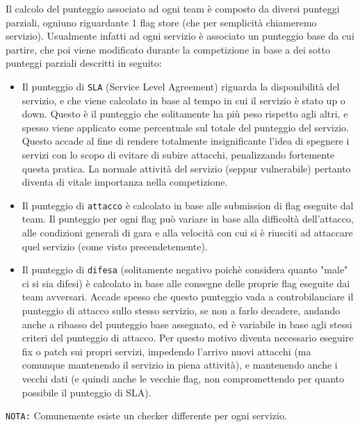Il calcolo del punteggio associato ad ogni team è composto da diversi punteggi parziali, ogniuno riguardante 1 flag store (che per semplicità chiameremo servizio).
Usualmente infatti ad ogni servizio è associato un punteggio base da cui partire, che poi viene modificato durante la competizione in base a dei sotto punteggi parziali descritti in seguito:
\begin{itemize}
    \setlength{\itemsep}{5pt}
    \setlength{\parskip}{5pt}
    \item Il punteggio di \texttt{SLA} (Service Level Agreement) riguarda la disponibilità del servizio, e che viene calcolato in base al tempo in cui il servizio è stato up o down.
    Questo è il punteggio che solitamente ha più peso rispetto agli altri, e spesso viene applicato come percentuale sul totale del punteggio del servizio. Questo accade al fine di
    rendere totalmente insignificante l'idea di spegnere i servizi con lo scopo di evitare di subire attacchi, penalizzando fortemente questa pratica.
    La normale attività del servizio (seppur vulnerabile) pertanto diventa di vitale importanza nella competizione.
    \item Il punteggio di \texttt{attacco} è calcolato in base alle submission di flag eseguite dal team. Il punteggio per ogni flag può variare in base alla difficoltà dell'attacco,
    alle condizioni generali di gara e alla velocità con cui si è riusciti ad attaccare quel servizio (come visto precendetemente).
    \item Il punteggio di \texttt{difesa} (solitamente negativo poichè considera quanto "male" ci si sia difesi) è calcolato in base alle consegne
    delle proprie flag eseguite dai team avversari. Accade spesso che questo punteggio vada a controbilanciare il punteggio di attacco sullo stesso servizio, se non a farlo decadere, andando anche a
    ribasso del punteggio base assegnato, ed è variabile in base agli stessi criteri del punteggio di attacco. Per questo motivo diventa necessario eseguire
    fix o patch sui propri servizi, impedendo l'arrivo nuovi attacchi (ma comunque mantenendo il servizio in piena attività),
    e mantenendo anche i vecchi dati (e quindi anche le vecchie flag, non compromettendo per quanto possibile il punteggio di SLA).
\end{itemize}

\texttt{NOTA:} Comunemente esiste un checker differente per ogni servizio.

\vspace{\fill}
\newpage

